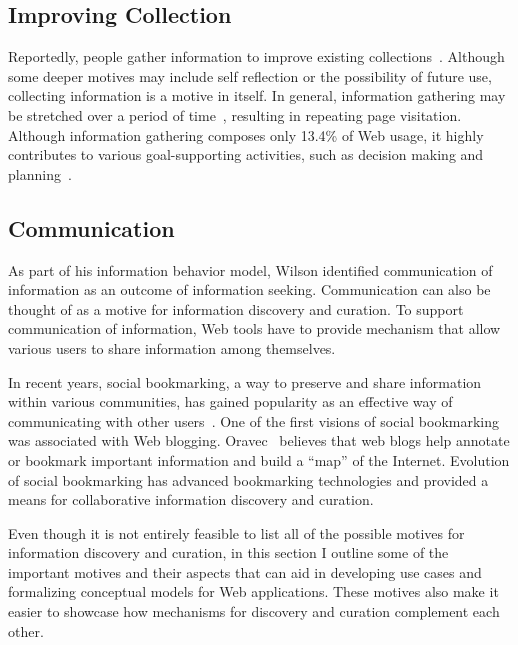 {{\subsection{Improving Collection}
Reportedly, people gather information to improve existing collections~\cite{lindley2012s}. Although some deeper motives may include self reflection or the possibility of future use, collecting information is a motive in itself. In general, information gathering may be stretched over a period of time~\cite{kellar2006goal}, resulting in repeating page visitation. Although information gathering composes only 13.4\% of Web usage, it highly contributes to various goal-supporting activities, such as decision making and planning~\cite{kellar2006goal}.

}

{\subsection{Communication}
As part of his information behavior model, Wilson identified communication of information as an outcome of information seeking. Communication can also be thought of as a motive for information discovery and curation. To support communication of information, Web tools have to provide mechanism that allow various users to share information among themselves. 

In recent years, social bookmarking, a way to preserve and share information within various communities, has gained popularity as an effective way of communicating with other users~\cite{estelles2010social}. One of the first visions of social bookmarking was associated with Web blogging. Oravec~\cite{oravec2002bookmarking} believes that web blogs help annotate or bookmark important information and build a ``map'' of the Internet. Evolution of social bookmarking has advanced bookmarking technologies and provided a means for collaborative information discovery and curation. 
}

Even though it is not entirely feasible to list all of the possible motives for information discovery and curation, in this section I outline some of the important motives and their aspects that can aid in developing use cases and formalizing conceptual models for Web applications. These motives also make it easier to showcase how mechanisms for discovery and curation complement each other. 
}

